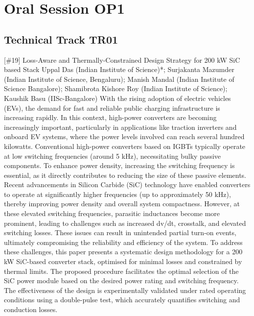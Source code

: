 \clearpage\section{Oral Session OP1}\nopagebreak \subsection{Technical Track TR01}\nopagebreak{} \begin{abstract_online} {[\#19] Loss-Aware and Thermally-Constrained Design Strategy for 200 kW SiC based Stack} {} {Uppal Das (Indian Institute of Science)*; Surjakanta Mazumder (Indian Institute of Science, Bengaluru); Manish Mandal (Indian Institute of Science Bangalore); Shamibrota Kishore Roy (Indian Institute of Science); Kaushik Basu (IISc-Bangalore)} {} With the rising adoption of electric vehicles (EVs), the demand for fast and reliable public charging infrastructure is increasing rapidly. In this context, high-power converters are becoming increasingly important, particularly in applications like traction inverters and onboard EV systems, where the power levels involved can reach several hundred kilowatts. Conventional high-power converters based on IGBTs typically operate at low switching frequencies (around 5 kHz), necessitating bulky passive components. To enhance power density, increasing the switching frequency is essential, as it directly contributes to reducing the size of these passive elements. Recent advancements in Silicon Carbide (SiC) technology have enabled converters to operate at significantly higher frequencies (up to approximately 50 kHz), thereby improving power density and overall system compactness. However, at these elevated switching frequencies, parasitic inductances become more prominent, leading to challenges such as increased dv/dt, crosstalk, and elevated switching losses. These issues can result in unintended partial turn-on events, ultimately compromising the reliability and efficiency of the system. To address these challenges, this paper presents a systematic design methodology for a 200 kW SiC-based converter stack, optimised for minimal losses and constrained by thermal limits. The proposed procedure facilitates the optimal selection of the SiC power module based on the desired power rating and switching frequency. The effectiveness of the design is experimentally validated under rated operating conditions using a double-pulse test, which accurately quantifies switching and conduction losses. \end{abstract_online} 
